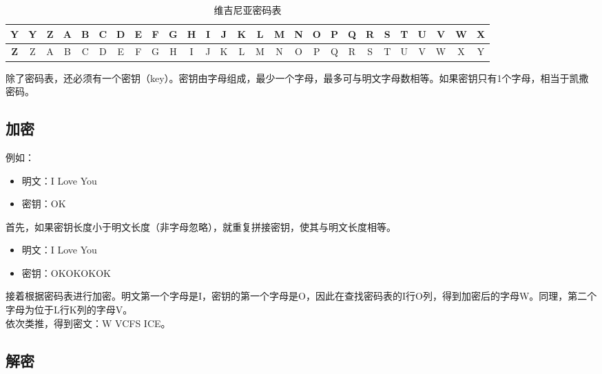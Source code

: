 \begin{table}[H]
{\begin{tabular}{c|c|c|c|c|c|c|c|c|c|c|c|c|c|c|c|c|c|c|c|c|c|c|c|c|c|c|}
            \hline
            \textbf{Y} & Y          & Z          & A          & B          & C          & D          & E          & F          & G          & H          & I          & J          & K          & L          & M          & N          & O          & P          & Q          & R          & S          & T          & U          & V          & W          & X          \\[-1ex]
            \hline
            \textbf{Z} & Z          & A          & B          & C          & D          & E          & F          & G          & H          & I          & J          & K          & L          & M          & N          & O          & P          & Q          & R          & S          & T          & U          & V          & W          & X          & Y          \\[-1ex]
            \hline
        \end{tabular}
    }
    \caption{维吉尼亚密码表}
\end{table}

除了密码表，还必须有一个密钥（key）。密钥由字母组成，最少一个字母，最多可与明文字母数相等。如果密钥只有1个字母，相当于凯撒密码。\\

\subsection{加密}

例如：

\begin{itemize}
    \item 明文：I Love You
    \item 密钥：OK
\end{itemize}

首先，如果密钥长度小于明文长度（非字母忽略），就重复拼接密钥，使其与明文长度相等。

\begin{itemize}
    \item 明文：I Love You
    \item 密钥：OKOKOKOK
\end{itemize}

接着根据密码表进行加密。明文第一个字母是I，密钥的第一个字母是O，因此在查找密码表的I行O列，得到加密后的字母W。同理，第二个字母为位于L行K列的字母V。\\

依次类推，得到密文：W VCFS ICE。\\

\subsection{解密}

